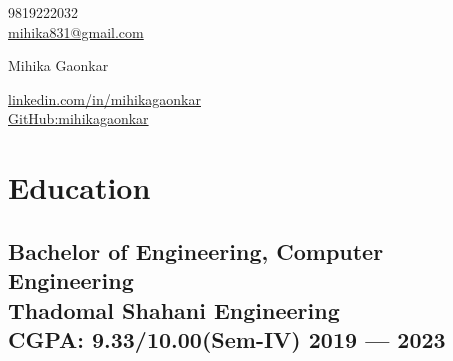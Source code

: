 \documentclass[10pt]{article}
\begin{document}
\begin{center}
    \begin{minipage}[b]{0.24\textwidth}
            \large 9819222032 \\
            \large \href{mailto:mihika831@gmail.com}{mihika831@gmail.com} 
    \end{minipage}%
    \begin{minipage}[b]{0.44\textwidth}
            \centering
            {\HUGE Mihika Gaonkar} \\ %
            \vspace{0.1cm}
            {\color{UI_blue} \Large{}} 
    \end{minipage}%
    \begin{minipage}[b]{0.30\textwidth}
            \flushright \large  %
            {\href{https://www.linkedin.com/in/mihikagaonkar/}{linkedin.com/in/mihikagaonkar} } \\
            \href{https://github.com/mihikagaonkar/}{GitHub:mihikagaonkar}
    \end{minipage}   
    
\vspace{-0.15cm} 
\end{center}






\section{Education }
\subsection*{Bachelor of Engineering, Computer Engineering\\ {\normalsize \normalfont Thadomal Shahani Engineering\\ CGPA: 9.33/10.00(Sem-IV)} \hfill  2019 ---  2023} 
\vspace{0.2cm}

\end{document}
